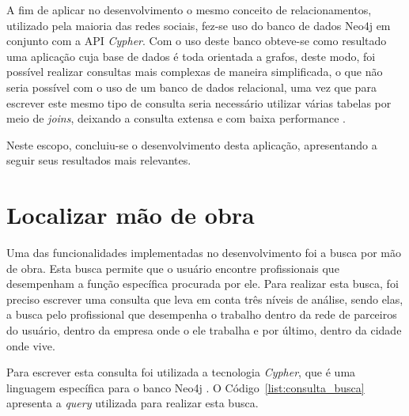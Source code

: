 \par A fim de aplicar no desenvolvimento o mesmo conceito de relacionamentos, utilizado pela maioria das redes sociais, fez-se uso do banco de dados Neo4j em conjunto com a API \textit{Cypher}. Com o uso deste banco obteve-se como resultado uma aplicação cuja base de dados é toda orientada a grafos, deste modo, foi possível realizar consultas mais complexas de maneira simplificada, o que não seria possível com o uso de um banco de dados relacional, uma vez que para escrever este mesmo tipo de consulta seria necessário utilizar várias tabelas por meio de \textit{joins}, deixando a consulta extensa e com baixa performance \cite{sadalage_fowler_nosql_distilled_brief_guide}.

\par Neste escopo, concluiu-se o desenvolvimento desta aplicação, apresentando a seguir seus resultados mais relevantes.


\section{Localizar mão de obra}

\par Uma das funcionalidades implementadas no desenvolvimento foi a busca por mão de obra. Esta busca permite que o usuário encontre profissionais que desempenham a função específica procurada por ele. Para realizar esta busca, foi preciso escrever uma consulta que leva em conta três níveis de análise, sendo elas, a busca pelo profissional que desempenha o trabalho dentro da rede de parceiros do usuário, dentro da empresa onde o ele trabalha e por último, dentro da cidade onde vive.  

\par Para escrever esta consulta foi utilizada a tecnologia \textit{Cypher}, que é uma linguagem específica para o banco Neo4j \cite{neo4j_team_manual}. O Código~\ref{list:consulta_busca} apresenta a \textit{query} utilizada para realizar esta busca.


